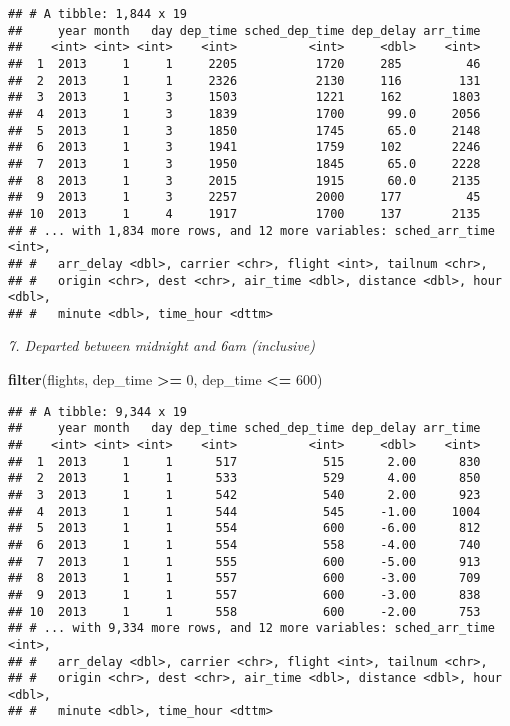 \documentclass[]{article}
\newenvironment{Shaded}{\begin{snugshade}}{\end{snugshade}}
\newcommand{\KeywordTok}[1]{\textcolor[rgb]{0.13,0.29,0.53}{\textbf{#1}}}
\newcommand{\DecValTok}[1]{\textcolor[rgb]{0.00,0.00,0.81}{#1}}
\newcommand{\StringTok}[1]{\textcolor[rgb]{0.31,0.60,0.02}{#1}}
\newcommand{\OperatorTok}[1]{\textcolor[rgb]{0.81,0.36,0.00}{\textbf{#1}}}
\newcommand{\NormalTok}[1]{#1}
\theoremstyle{definition}
\theoremstyle{definition}
\theoremstyle{definition}
\theoremstyle{remark}
\begin{document}
\begin{verbatim}
## # A tibble: 1,844 x 19
##     year month   day dep_time sched_dep_time dep_delay arr_time
##    <int> <int> <int>    <int>          <int>     <dbl>    <int>
##  1  2013     1     1     2205           1720     285         46
##  2  2013     1     1     2326           2130     116        131
##  3  2013     1     3     1503           1221     162       1803
##  4  2013     1     3     1839           1700      99.0     2056
##  5  2013     1     3     1850           1745      65.0     2148
##  6  2013     1     3     1941           1759     102       2246
##  7  2013     1     3     1950           1845      65.0     2228
##  8  2013     1     3     2015           1915      60.0     2135
##  9  2013     1     3     2257           2000     177         45
## 10  2013     1     4     1917           1700     137       2135
## # ... with 1,834 more rows, and 12 more variables: sched_arr_time <int>,
## #   arr_delay <dbl>, carrier <chr>, flight <int>, tailnum <chr>,
## #   origin <chr>, dest <chr>, air_time <dbl>, distance <dbl>, hour <dbl>,
## #   minute <dbl>, time_hour <dttm>
\end{verbatim}

\emph{7. Departed between midnight and 6am (inclusive)}

\begin{Shaded}
\begin{Highlighting}[]
\KeywordTok{filter}\NormalTok{(flights, dep_time }\OperatorTok{>=}\StringTok{ }\DecValTok{0}\NormalTok{, dep_time }\OperatorTok{<=}\StringTok{ }\DecValTok{600}\NormalTok{)}
\end{Highlighting}
\end{Shaded}

\begin{verbatim}
## # A tibble: 9,344 x 19
##     year month   day dep_time sched_dep_time dep_delay arr_time
##    <int> <int> <int>    <int>          <int>     <dbl>    <int>
##  1  2013     1     1      517            515      2.00      830
##  2  2013     1     1      533            529      4.00      850
##  3  2013     1     1      542            540      2.00      923
##  4  2013     1     1      544            545     -1.00     1004
##  5  2013     1     1      554            600     -6.00      812
##  6  2013     1     1      554            558     -4.00      740
##  7  2013     1     1      555            600     -5.00      913
##  8  2013     1     1      557            600     -3.00      709
##  9  2013     1     1      557            600     -3.00      838
## 10  2013     1     1      558            600     -2.00      753
## # ... with 9,334 more rows, and 12 more variables: sched_arr_time <int>,
## #   arr_delay <dbl>, carrier <chr>, flight <int>, tailnum <chr>,
## #   origin <chr>, dest <chr>, air_time <dbl>, distance <dbl>, hour <dbl>,
## #   minute <dbl>, time_hour <dttm>
\end{verbatim}
\end{document}
